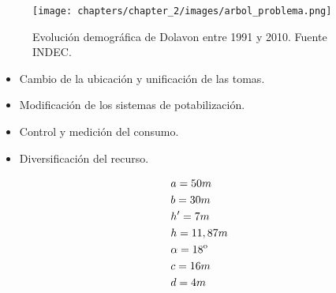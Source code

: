 \begin{landscape}

\end{landscape}


\begin{figure}[H]
\begin{center}
     \texttt{[image: chapters/chapter\_2/images/arbol\_problema.png]}
\end{center}
\caption{Evolución demográfica de Dolavon entre 1991 y 2010. Fuente INDEC.}
\end{figure}


\begin{itemize}
\item Cambio de la ubicación y unificación de las tomas.
\item Modificación de los sistemas de potabilización.
\item Control y medición del consumo.
\item Diversificación del recurso.
\end{itemize}

\begin{align*}
& a=50m \\
& b=30m \\
& h'=7m \\
& h=11,87m \\
& \alpha=18\textsuperscript{o} \\
& c=16m \\
& d=4m
\end{align*}

\newpage